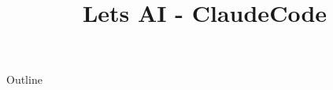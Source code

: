 \documentclass[xcolor=dvipsnames,compress,t,pdf,9pt]{beamer}
\title[\insertframenumber /\inserttotalframenumber]{Lets AI - ClaudeCode}
\begin{document}
	\begin{frame}
	\titlepage
	\end{frame}
	
	\begin{frame}{Outline}
	    \tableofcontents
	\end{frame}

%	
	
%	
\end{document}
